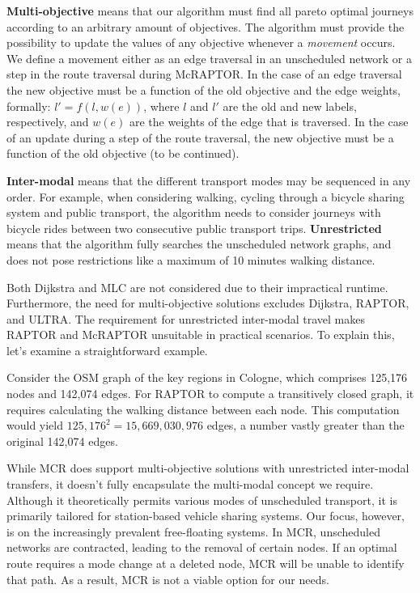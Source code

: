 \textbf{Multi-objective} means that our algorithm must find all pareto optimal journeys according to an arbitrary amount of objectives.
The algorithm must provide the possibility to update the values of any objective whenever a \textit{movement} occurs.
We define a movement either as an edge traversal in an unscheduled network or a step in the route traversal during McRAPTOR.
In the case of an edge traversal the new objective must be a function of the old objective and the edge weights, formally: \(l' = f(l, w(e))\), where \(l\) and \(l'\) are the old and new labels, respectively, and \(w(e)\) are the weights of the edge that is traversed.
In the case of an update during a step of the route traversal, the new objective must be a function of the old objective (to be continued).

\textbf{Inter-modal} means that the different transport modes may be sequenced in any order.
For example, when considering walking, cycling through a bicycle sharing system and public transport, the algorithm needs to consider journeys with bicycle rides between two consecutive public transport trips.
\textbf{Unrestricted} means that the algorithm fully searches the unscheduled network graphs, and does not pose restrictions like a maximum of 10 minutes walking distance.


Both Dijkstra and MLC are not considered due to their impractical runtime.
Furthermore, the need for multi-objective solutions excludes Dijkstra, RAPTOR, and ULTRA.
The requirement for unrestricted inter-modal travel makes RAPTOR and McRAPTOR unsuitable in practical scenarios.
To explain this, let's examine a straightforward example.

Consider the OSM graph of the key regions in Cologne, which comprises 125,176 nodes and 142,074 edges.
For RAPTOR to compute a transitively closed graph, it requires calculating the walking distance between each node.
This computation would yield \(125,176^2 = 15,669,030,976\) edges, a number vastly greater than the original 142,074 edges.

While MCR does support multi-objective solutions with unrestricted inter-modal transfers, it doesn't fully encapsulate the multi-modal concept we require.
Although it theoretically permits various modes of unscheduled transport, it is primarily tailored for station-based vehicle sharing systems.
Our focus, however, is on the increasingly prevalent free-floating systems.
In MCR, unscheduled networks are contracted, leading to the removal of certain nodes.
If an optimal route requires a mode change at a deleted node, MCR will be unable to identify that path.
As a result, MCR is not a viable option for our needs.


